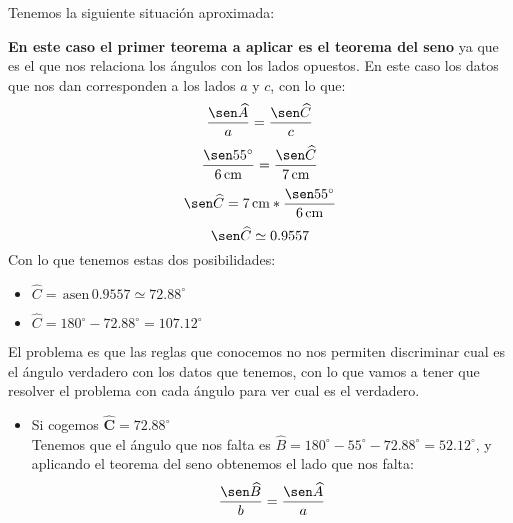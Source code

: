 \documentclass[a4paper,11pt,answers]{exam}
\newcommand{\degree}{^\circ}
\newcommand{\asen}{\,\mathrm{asen}\,}
\newcommand\unidad[1]{\,\text{#1}}
\begin{document}
\begin{solution}
  Tenemos la siguiente situación aproximada:
    \begin{center}
  \end{center}
  \textbf {En este caso el primer teorema a aplicar es el teorema del seno} ya que es el que nos
  relaciona los ángulos con los lados opuestos. En este caso los datos que nos dan corresponden
  a los lados $a$ y $c$, con lo que:
  \[\frac{\sen \widehat{A}}{a} = \frac{\sen \widehat{C}}{c}\]
  \[\frac{\sen 55\degree}{6\unidad{cm}} = \frac{\sen \widehat{C}}{7\unidad{cm}}\]
  \[\sen \widehat{C} = 7\unidad{cm}*\frac{\sen 55\degree}{6\unidad{cm}}\]
  \[\sen \widehat{C} \simeq 0.9557\]
  Con lo que tenemos estas dos posibilidades:
  \begin{itemize}
  \item $\widehat{C} = \asen 0.9557 \simeq 72.88\degree$
  \item $\widehat{C} = 180\degree - 72.88\degree = 107.12\degree$
  \end{itemize}
  El problema es que las reglas que conocemos no nos permiten discriminar cual es el ángulo verdadero
  con los datos que tenemos, con lo que vamos a tener que resolver el problema con cada ángulo para
  ver cual es el verdadero.
  \begin{itemize}
  \item Si cogemos $\boldsymbol{\widehat{C} = 72.88\degree}$\\
    Tenemos que el ángulo que nos falta es $\widehat{B} = 180\degree - 55\degree - 72.88\degree
    = 52.12\degree$, y aplicando el teorema del seno obtenemos el lado que nos falta:
    \[\frac{\sen \widehat{B}}{b} = \frac{\sen \widehat{A}}{a}\]

\end{itemize}
\end{solution}
\end{document}
